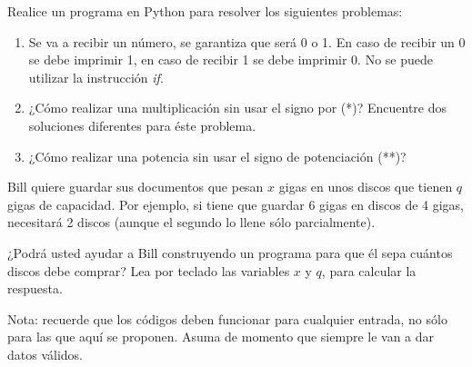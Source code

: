 \begin{Exercise}[title={Calentamiento}]
Realice un programa en Python para resolver los siguientes problemas:
\begin{enumerate}
\item Se va a recibir un número, se garantiza que será 0 o 1. En caso de recibir un 0 se debe imprimir 1, en caso de recibir 1 se debe imprimir 0. No se puede utilizar la instrucción \emph{if}.

\item ¿Cómo realizar una multiplicación sin usar el signo por (*)? Encuentre dos soluciones diferentes para éste problema.

\item ¿Cómo realizar una potencia sin usar el signo de potenciación (**)?
\end{enumerate}
\end{Exercise}
\begin{Answer}


\newpage
\end{Answer}
\vfill
\begin{Exercise}[title={La Copia de Seguridad}]
Bill quiere guardar sus documentos que pesan $x$ gigas en unos discos que tienen $q$ gigas de capacidad. Por ejemplo, si tiene que guardar 6 gigas en discos de 4 gigas, necesitará 2 discos (aunque el segundo lo llene sólo parcialmente).

¿Podrá usted ayudar a Bill construyendo un programa para que él sepa cuántos discos debe comprar? Lea por teclado las variables $x$ y $q$, para calcular la respuesta.

Nota: recuerde que los códigos deben funcionar para cualquier entrada, no sólo para las que aquí se proponen. Asuma de momento que siempre le van a dar datos válidos.

\end{Exercise}

\newpage
\begin{Answer}
 
 
\end{Answer}

